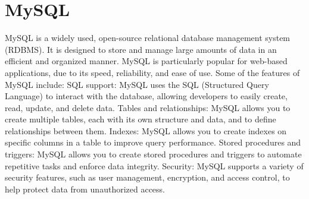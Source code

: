 \section{MySQL}
MySQL is a widely used, open-source relational database management system (RDBMS). It is designed to store and manage large amounts of data in an efficient and organized manner. MySQL is particularly popular for web-based applications, due to its speed, reliability, and ease of use.
Some of the features of MySQL include:
SQL support: MySQL uses the SQL (Structured Query Language) to interact with the database, allowing developers to easily create, read, update, and delete data.
Tables and relationships: MySQL allows you to create multiple tables, each with its own structure and data, and to define relationships between them.
Indexes: MySQL allows you to create indexes on specific columns in a table to improve query performance.
Stored procedures and triggers: MySQL allows you to create stored procedures and triggers to automate repetitive tasks and enforce data integrity.
Security: MySQL supports a variety of security features, such as user management, encryption, and access control, to help protect data from unauthorized access.


